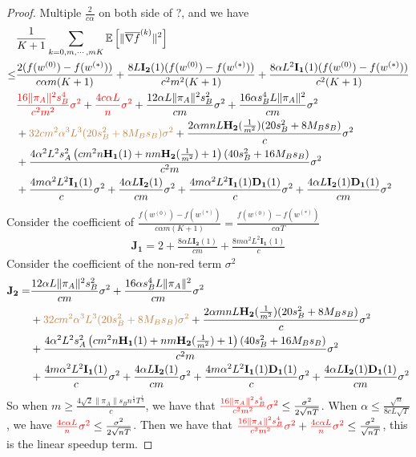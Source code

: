 \documentclass{article}
\newcommand{\EE}[1]{\mathbb{E}\left[#1\right]}
\newcommand{\norm}[1]{\| #1 \|}
\begin{document}
\begin{proof}
  Multiple $\frac{2}{c\alpha}$ on both side of ?, and we have
  \begin{align*}
    &\frac{1 }{K+1}\sum_{k=0,m,\cdots,mK}\EE{\norm{\overline{\nabla f}^{(k)}}^2}
  \\\leq& \frac{2(f(w^{(0)})-f(w^{(*)}))}{c\alpha m(K+1)}+\frac{8L\mathbf{I_2}(1)(f(w^{(0)})- f(w^{(*)}))}{c^2m^2(K+1)}+\frac{8\alpha L^2\mathbf{I_1}(1)( f(w^{(0)})- f(w^{(*)}))}{c^2(K+1)}
  \\&\textcolor{red}{\frac{16 \norm{\pi_A}^2s_B^4}{c^2m^2}\sigma^2}+\textcolor{red}{ \frac{4c\alpha L}{n}\sigma^2}+\frac{12\alpha L\norm{\pi_A}^2s_B^2}{cm}\sigma^2+\frac{16\alpha s_B^4L\norm{\pi_A}^2}{cm}\sigma^2\\&+\textcolor{brown}{32cm^2\alpha^3L^3(20s_B^2+8M_Bs_B)\sigma^2}+\frac{2\alpha mnL \mathbf{H_2}(\frac{1}{m^2})(20s_B^2+8M_Bs_B)}{c}\sigma^2\\ &+\frac{4\alpha^2 L^2s_A^2\left(cm^2n\mathbf{H_1}(1)+nm\mathbf{H_2}(\frac{1}{m^2})+1\right)(40s_B^2+16M_Bs_B)}{c^2m}\sigma^2\\&+\frac{4m\alpha^2L^2\mathbf{I_1}(1)}{c}\sigma^2+\frac{4\alpha L\mathbf{I_2}(1)}{cm}\sigma^2
  +\frac{4m\alpha^2L^2\mathbf{I_1}(1)\mathbf{D_1}(1)}{c}\sigma^2
  +\frac{4\alpha L\mathbf{I_2}(1)\mathbf{D_1}(1)}{cm}\sigma^2
  \end{align*}
  Consider the coefficient of $\frac{f(w^{(0)})-f(w^{(*)})}{c\alpha m(K+1)}=\frac{f(w^{(0)})-f(w^{(*)})}{c\alpha T}$
  \begin{align*}
    \mathbf{J_1}=2+\frac{8\alpha L\mathbf{I_2}(1)}{c m}+\frac{8m\alpha^2 L^2\mathbf{I_1}(1)}{c}
  \end{align*}
  Consider the coefficient of the non-red term $\sigma^2$
  \begin{align*}
    \mathbf{J_2}=&\frac{12\alpha L\norm{\pi_A}^2s_B^2}{cm}\sigma^2+\frac{16\alpha s_B^4L\norm{\pi_A}^2}{cm}\sigma^2\\&+\textcolor{brown}{32cm^2\alpha^3L^3(20s_B^2+8M_Bs_B)\sigma^2}+\frac{2\alpha mnL \mathbf{H_2}(\frac{1}{m^2})(20s_B^2+8M_Bs_B)}{c}\sigma^2\\ &+\frac{4\alpha^2 L^2s_A^2\left(cm^2n\mathbf{H_1}(1)+nm\mathbf{H_2}(\frac{1}{m^2})+1\right)(40s_B^2+16M_Bs_B)}{c^2m}\sigma^2\\&+\frac{4m\alpha^2L^2\mathbf{I_1}(1)}{c}\sigma^2+\frac{4\alpha L\mathbf{I_2}(1)}{cm}\sigma^2
    +\frac{4m\alpha^2L^2\mathbf{I_1}(1)\mathbf{D_1}(1)}{c}\sigma^2
    +\frac{4\alpha L\mathbf{I_2}(1)\mathbf{D_1}(1)}{cm}\sigma^2
  \end{align*}
  So when $m \geq \frac{4\sqrt{2}\norm{\pi_A}s_Bn^{\frac{1}{4}}T^{\frac{1}{4}}}{c}$, we have that $\textcolor{red}{\frac{16 \norm{\pi_A}^2s_B^4}{c^2m^2}\sigma^2}\leq \frac{\sigma^2}{2\sqrt{nT}}$. When $\alpha \leq \frac{\sqrt{n}}{8cL\sqrt{T}}$, we have $\textcolor{red}{ \frac{4c\alpha L}{n}\sigma^2}\leq \frac{\sigma^2}{2\sqrt{nT}}$. Then we have that $\textcolor{red}{\frac{16 \norm{\pi_A}^2s_B^4}{c^2m^2}\sigma^2}+\textcolor{red}{ \frac{4c\alpha L}{n}\sigma^2} \leq \frac{\sigma^2}{\sqrt{nT}}$, this is the linear speedup term.


\end{proof}
\end{document}
